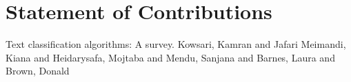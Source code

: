 \documentclass[conference]{IEEEtran}
\begin{document}
\section{Statement of Contributions}
\begin{thebibliography}{00}
	 Text classification algorithms: A survey. Kowsari, Kamran and Jafari Meimandi, Kiana and Heidarysafa, Mojtaba and Mendu, Sanjana and Barnes, Laura and Brown, Donald
\end{thebibliography}
	\vspace{12pt}
	
	





%
\end{document}
